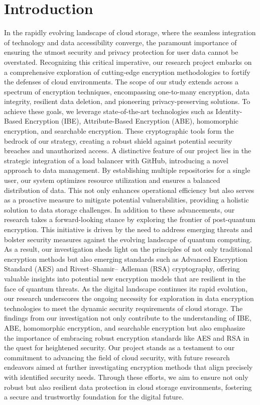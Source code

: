  \setcounter{page}{1}
\chapter{Introduction}
\justifying
   In the rapidly evolving landscape of cloud storage, where the seamless integration of technology
and data accessibility converge, the paramount importance of ensuring the utmost security and
privacy protection for user data cannot be overstated. Recognizing this critical imperative, our
research project embarks on a comprehensive exploration of cutting-edge encryption methodologies
to fortify the defenses of cloud environments.
The scope of our study extends across a spectrum of encryption techniques, encompassing one-to-many encryption, data integrity, resilient data deletion, and pioneering privacy-preserving solutions.
To achieve these goals, we leverage state-of-the-art technologies such as Identity-Based Encryption
(IBE), Attribute-Based Encryption (ABE), homomorphic encryption, and searchable encryption.
These cryptographic tools form the bedrock of our strategy, creating a robust shield against
potential security breaches and unauthorized access.
A distinctive feature of our project lies in the strategic integration of a load balancer with GitHub,
introducing a novel approach to data management. By establishing multiple repositories for a single
user, our system optimizes resource utilization and ensures a balanced distribution of data. This not
only enhances operational efficiency but also serves as a proactive measure to mitigate potential
vulnerabilities, providing a holistic solution to data storage challenges.
In addition to these advancements, our research takes a forward-looking stance by exploring the
frontier of post-quantum encryption. This initiative is driven by the need to address emerging
threats and bolster security measures against the evolving landscape of quantum computing. As a
result, our investigation sheds light on the principles of not only traditional encryption methods but
also emerging standards such as Advanced Encryption Standard (AES) and Rivest–Shamir–
Adleman (RSA) cryptography, offering valuable insights into potential new encryption models that
are resilient in the face of quantum threats.
As the digital landscape continues its rapid evolution, our research underscores the ongoing
necessity for exploration in data encryption technologies to meet the dynamic security requirements
of cloud storage. The findings from our investigation not only contribute to the understanding of
IBE, ABE, homomorphic encryption, and searchable encryption but also emphasize the importance
of embracing robust encryption standards like AES and RSA in the quest for heightened security.
Our project stands as a testament to our commitment to advancing the field of cloud security, with
future research endeavors aimed at further investigating encryption methods that align precisely
with identified security needs. Through these efforts, we aim to ensure not only robust but also
resilient data protection in cloud storage environments, fostering a secure and trustworthy
foundation for the digital future.


\clearpage